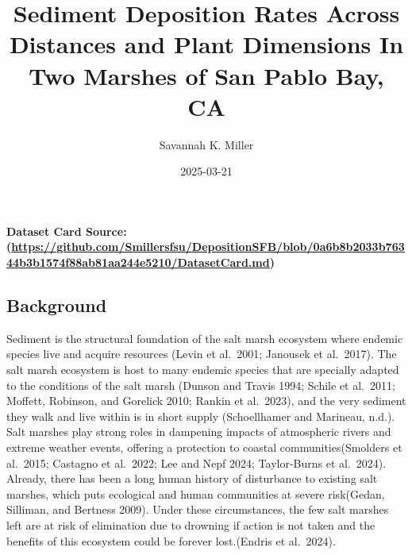\documentclass[
]{article}
\title{Sediment Deposition Rates Across Distances and Plant Dimensions
In Two Marshes of San Pablo Bay, CA}
\author{Savannah K. Miller}
\date{2025-03-21}
\begin{document}
\maketitle

\paragraph{\texorpdfstring{Dataset Card Source:
(\url{https://github.com/Smillersfsu/DepositionSFB/blob/0a6b8b2033b76344b3b1574f88ab81aa244e5210/DatasetCard.md})}{Dataset Card Source: (https://github.com/Smillersfsu/DepositionSFB/blob/0a6b8b2033b76344b3b1574f88ab81aa244e5210/DatasetCard.md)}}\label{dataset-card-source-httpsgithub.comsmillersfsudepositionsfbblob0a6b8b2033b76344b3b1574f88ab81aa244e5210datasetcard.md}

\subsection{Background}\label{background}

Sediment is the structural foundation of the salt marsh ecosystem where
endemic species live and acquire resources (Levin et al.~2001; Janousek
et al.~2017). The salt marsh ecosystem is host to many endemic species
that are specially adapted to the conditions of the salt marsh (Dunson
and Travis 1994; Schile et al.~2011; Moffett, Robinson, and Gorelick
2010; Rankin et al.~2023), and the very sediment they walk and live
within is in short supply (Schoellhamer and Marineau, n.d.). Salt
marshes play strong roles in dampening impacts of atmospheric rivers and
extreme weather events, offering a protection to coastal
communities(Smolders et al.~2015; Castagno et al.~2022; Lee and Nepf
2024; Taylor-Burns et al.~2024). Already, there has been a long human
history of disturbance to existing salt marshes, which puts ecological
and human communities at severe risk(Gedan, Silliman, and Bertness
2009). Under these circumstances, the few salt marshes left are at risk
of elimination due to drowning if action is not taken and the benefits
of this ecosystem could be forever lost.(Endris et al.~2024).
\end{document}
